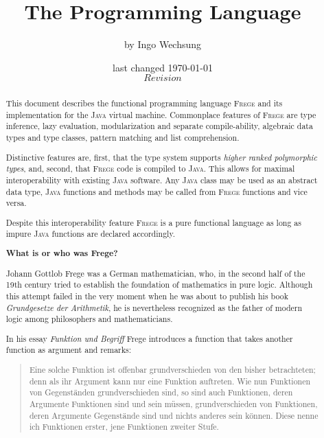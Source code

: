 \documentclass[a4paper,landscape,twocolumn]{report}
\date{last changed \today{} \\ $Revision$}
\author{\small{by Ingo Wechsung}}
\title{The \frege{} Programming Language}
\newcommand{\inmargin}[1]{\marginpar{\scriptsize\raggedright #1}}
\newcommand{\frege}[0]{\textsc{Frege}}
\newcommand{\java}[0]{\textsc{Java}}
\begin{document}
\maketitle


\begingroup 
\let\onecolumn\twocolumn 

\begin{abstract}

This document describes the functional programming language \frege{}
and its implementation
for the \java{} virtual machine. Commonplace features of \frege{} are
type inference,
lazy evaluation,
modularization and separate compile-ability,
algebraic data types and type classes,
pattern matching and list comprehension.

Distinctive features are, first, that the type system supports
\emph{higher ranked polymorphic types},
and, second,
that \frege{} code is compiled to \java{}.
This allows for maximal interoperability with existing
\java{} software.
Any \java{} class may be used as an abstract data type, \java{}
functions and methods may be called from \frege{} functions and vice
versa.

Despite this interoperability feature  \frege{} is a pure functional language as long as impure \java{} functions are declared accordingly.

\begin{center}\textbf{What is or who was Frege?}\end{center}

Johann Gottlob Frege
was a
German mathematician, who, in the second half of the 19th
century tried to establish the foundation of mathematics in pure
logic. Although this attempt failed in the very moment when he
was about to publish his book \emph{Grundgesetze der Arithmetik},
he is nevertheless recognized as the father of modern logic among
philosophers and mathematicians.

In his essay \emph{Funktion und Begriff} \cite{f1891} Frege introduces a function that takes another function as argument and remarks:

\begin{quote}
\small{
Eine solche Funktion ist offenbar grundverschieden von den bisher betrachteten; denn als ihr Argument kann nur eine Funktion auftreten. Wie nun Funktionen von Gegenständen grundverschieden sind, so sind auch Funktionen, deren Argumente Funktionen sind und sein müssen, grundverschieden von Funktionen, deren Argumente Gegenstände sind und nichts anderes sein können. Diese nenne ich Funktionen erster, jene Funktionen zweiter Stufe.
}
\end{quote}


\end{abstract}
\end{document}
